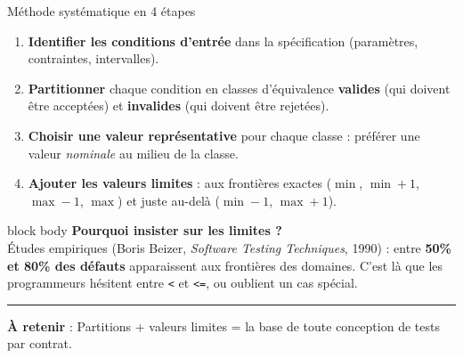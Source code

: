 \documentclass[aspectratio=169,11pt]{beamer}
\newcommand{\takeaway}[1]{%
\vfill\begin{beamercolorbox}[wd=\linewidth,sep=0.4em]{}
\color{accent2}\rule[0.6ex]{1.2em}{1.2pt}\hspace{0.4em}%
\textbf{\color{accent2}\small À retenir} \textcolor{textsoft}{:} %
{\small\color{textmain}#1}
\end{beamercolorbox}}
\begin{document}
\begin{frame}[t]{Méthode systématique en 4 étapes}
\vspace{0.2cm}
\footnotesize
\begin{enumerate}\itemsep0.35em
\item \textbf{Identifier les conditions d'entrée} dans la spécification (paramètres, contraintes, intervalles).
\item \textbf{Partitionner} chaque condition en classes d'équivalence \textbf{valides} (qui doivent être acceptées) et \textbf{invalides} (qui doivent être rejetées).
\item \textbf{Choisir une valeur représentative} pour chaque classe : préférer une valeur \textit{nominale} au milieu de la classe.
\item \textbf{Ajouter les valeurs limites} : aux frontières exactes ($\min$, $\min+1$, $\max-1$, $\max$) et juste au-delà ($\min-1$, $\max+1$).
\end{enumerate}
\vspace{0.5cm}

\begin{beamercolorbox}[sep=0.5em,rounded=true]{block body}
\scriptsize\textbf{\color{accent}Pourquoi insister sur les limites ?}\\[0.1em]
Études empiriques (Boris Beizer, \emph{Software Testing Techniques}, 1990) : entre \textbf{50\% et 80\% des défauts} apparaissent aux frontières des domaines. C'est là que les programmeurs hésitent entre \texttt{<} et \texttt{<=}, ou oublient un cas spécial.
\end{beamercolorbox}
\takeaway{Partitions + valeurs limites = la base de toute conception de tests par contrat.}
\end{frame}
\end{document}
